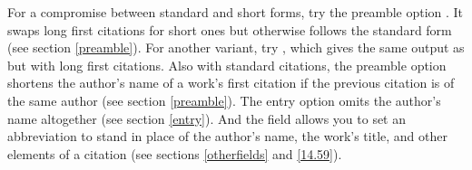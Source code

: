 \documentclass[11pt,letterpaper,oneside]{article}
\begin{document}

\begin{citeonly}
\item \cite[3]{morrison2004a}
\item \cite[18]{morrison2004a}
\item \cite[18]{morrison2004a}
\item \cite[24--26]{morrison2004a}
\item \cite[401-2]{morrison2004b}
\item \cite[433]{morrison2004b}
\item \cite[37--38]{diaz2007}
\item \cite[403]{morrison2004b}
\item \cite[152]{diaz2007}
\item \cite[201-2]{diaz2007}
\item \cites[240]{morrison2004b}[32]{morrison2004a}
\item \cite[33]{morrison2004a}
\end{citeonly}

For a compromise between standard and short forms, try the  preamble
option . It swaps long first citations for short ones
but otherwise follows the standard form (see section \ref{preamble}).
For another variant, try , which gives the same output
as  but with long first citations. Also with standard
citations, the preamble option  shortens the author's
name of a work's first citation if the previous citation is of the
same author (see section \ref{preamble}). The entry option
 omits the author's name altogether (see section
\ref{entry}). And the  field allows you to set an
abbreviation to stand in place of the author's name, the work's title,
and other elements of a citation (see sections \ref{otherfields} and
\ref{14.59}).
\end{document}
